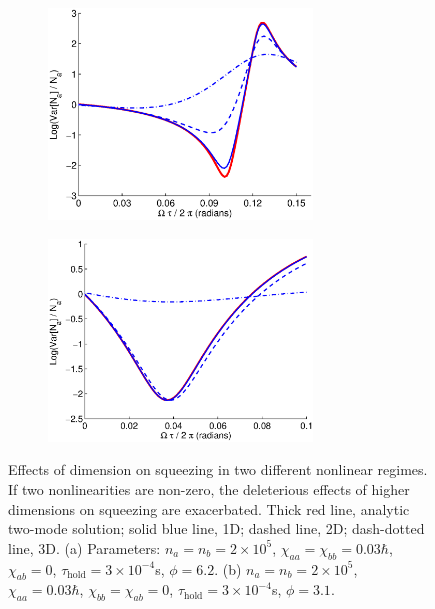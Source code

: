 \documentclass{iopart}
\begin{document}
\begin{figure}
  \centering
  \begin{subfigure}{.5\textwidth}
    \centering
    \includegraphics[width=7cm]{figures/dimensional_effects_on_squeezing_1.eps}
    \label{figDimensionalSqueezingEffects:sub1}
  \end{subfigure}%
  \begin{subfigure}{.5\textwidth}
    \centering
    \includegraphics[width=7cm]{figures/dimensional_effects_on_squeezing_2.eps}
    \label{figDimensionalSqueezingEffects:sub2}
  \end{subfigure}
\caption{Effects of dimension on squeezing in two different nonlinear regimes. If two nonlinearities are non-zero, the deleterious effects of higher dimensions on squeezing are exacerbated. Thick red line, analytic two-mode solution; solid blue line, 1D; dashed line, 2D; dash-dotted line, 3D. (a) Parameters: $n_a = n_b =2 \times 10^5$, $\chi_{aa}=\chi_{bb}=0.03\hbar$, $\chi_{ab}=0$, $\tau_{\mathrm{hold}}=3\times 10^{-4}$s, $\phi=6.2$. (b) $n_a = n_b =2 \times 10^5$, $\chi_{aa}=0.03\hbar$, $\chi_{bb}=\chi_{ab}=0$, $\tau_{\mathrm{hold}}=3\times 10^{-4}$s, $\phi=3.1$.}
  \label{figDimensionalSqueezingEffects}
\end{figure}
\end{document}
